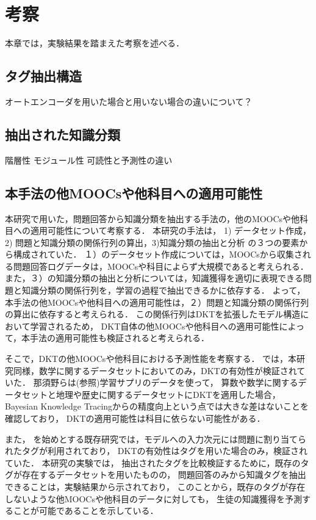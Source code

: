 \chapter{考察}
\label{chap:discussion}
\fancyhf{}
\rhead{\thepage}
\cfoot{\thepage}

本章では，実験結果を踏まえた考察を述べる．


\section{タグ抽出構造}
オートエンコーダを用いた場合と用いない場合の違いについて？



\section{抽出された知識分類}
階層性
モジュール性
可読性と予測性の違い




\section{本手法の他MOOCsや他科目への適用可能性}
本研究で用いた，問題回答から知識分類を抽出する手法の，他のMOOCsや他科目への適用可能性について考察する．
本研究の手法は，
1) データセット作成，2) 問題と知識分類の関係行列の算出，3)知識分類の抽出と分析
の３つの要素から構成されていた．
１）のデータセット作成については，MOOCsから収集される問題回答ログデータは，MOOCsや科目によらず大規模であると考えられる．
また，３）の知識分類の抽出と分析については，知識獲得を適切に表現できる問題と知識分類の関係行列を，学習の過程で抽出できるかに依存する．
よって，本手法の他MOOCsや他科目への適用可能性は，２）問題と知識分類の関係行列の算出に依存すると考えられる．
この関係行列はDKTを拡張したモデル構造において学習されるため，
DKT自体の他MOOCsや他科目への適用可能性によって，本手法の適用可能性も検証されると考えられる．


そこで，DKTの他MOOCsや他科目における予測性能を考察する．
\cite{piech2015deep}では，本研究同様，数学に関するデータセットにおいてのみ，DKTの有効性が検証されていた．
那須野らは(参照)学習サプリのデータを使って，
算数や数学に関するデータセットと地理や歴史に関するデータセットにDKTを適用した場合，
Bayesian Knowledge Tracingからの精度向上という点では大きな差はないことを確認しており，
DKTの適用可能性は科目に依らない可能性がある．


また，
\cite{piech2015deep}を始めとする既存研究では，モデルへの入力次元には問題に割り当てられたタグが利用されており，
DKTの有効性はタグを用いた場合のみ，検証されていた．
本研究の実験では，
抽出されたタグを比較検証するために，既存のタグが存在するデータセットを用いたものの，
問題回答のみから知識タグを抽出できることは，実験結果から示されており，
このことから，既存のタグが存在しないような他MOOCsや他科目のデータに対しても，
生徒の知識獲得を予測することが可能であることを示している．


